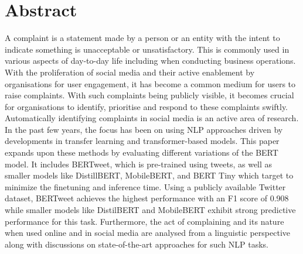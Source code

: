 \chapter*{\Large \center Abstract}

A complaint is a statement made by a person or an entity with the intent to indicate something is unacceptable or unsatisfactory. This is commonly used in various aspects of day-to-day life including when conducting business operations. With the proliferation of social media and their active enablement by organisations for user engagement, it has become a common medium for users to raise complaints. With such complaints being publicly visible, it becomes crucial for organisations to identify, prioritise and respond to these complaints swiftly. Automatically identifying complaints in social media is an active area of research. In the past few years, the focus has been on using NLP approaches driven by developments in transfer learning and transformer-based models.
\newline \newline
This paper expands upon these methods by evaluating different variations of the BERT model. It includes BERTweet, which is pre-trained using tweets, as well as smaller models like DistillBERT, MobileBERT, and BERT Tiny which target to minimize the finetuning and inference time. Using a publicly available Twitter dataset, BERTweet achieves the highest performance with an F1 score of 0.908 while smaller models like DistilBERT and MobileBERT exhibit strong predictive performance for this task. Furthermore, the act of complaining and its nature when used online and in social media are analysed from a linguistic perspective along with discussions on state-of-the-art approaches for such NLP tasks.
